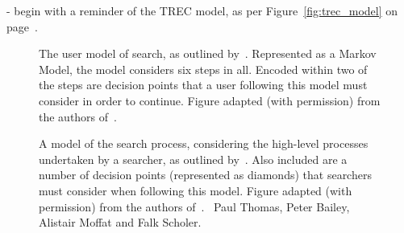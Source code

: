 - begin with a reminder of the TREC model, as per Figure~\ref{fig:trec_model} on page~\pageref{fig:trec_model}.

\begin{figure}[t!]
    \centering
    \caption[Model of the search process by~\cite{baskaya2013behavioural_factors}]{The user model of search, as outlined by~\citealt{baskaya2013behavioural_factors}. Represented as a Markov Model, the model considers six steps in all. Encoded within two of the steps are decision points that a user following this model must consider in order to continue. Figure adapted (with permission) from the authors of~\citealt{baskaya2013behavioural_factors}.}
    \label{fig:baskaya_model}
\end{figure}

\begin{figure}[t!]
    \centering
    \caption[Model of the search process by~\cite{thomas2014modelling_behaviour}]{A model of the search process, considering the high-level processes undertaken by a searcher, as outlined by~\cite{thomas2014modelling_behaviour}. Also included are a number of decision points (represented as diamonds) that searchers must consider when following this model. Figure adapted (with permission) from the authors of~\citealt{thomas2014modelling_behaviour}. \textcopyright~Paul Thomas, Peter Bailey, Alistair Moffat and Falk Scholer.}
    \label{fig:thomas_model}
\end{figure}

